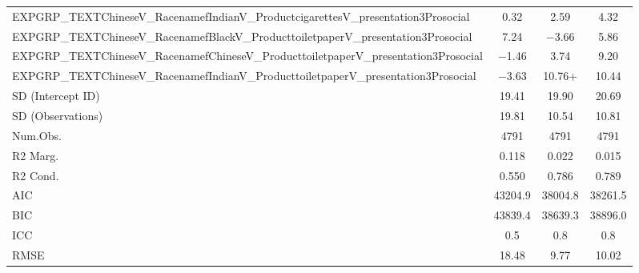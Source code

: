 \documentclass[]{report}
\begin{document}
\begin{table}
{\begin{tabular}[t]{lccc}
		EXPGRP\_TEXTChineseV\_RacenamefIndianV\_ProductcigarettesV\_presentation3Prosocial & \num{0.32} & \num{2.59} & \num{4.32}\\
		EXPGRP\_TEXTChineseV\_RacenamefBlackV\_ProducttoiletpaperV\_presentation3Prosocial & \num{7.24} & \num{-3.66} & \num{5.86}\\
		EXPGRP\_TEXTChineseV\_RacenamefChineseV\_ProducttoiletpaperV\_presentation3Prosocial & \num{-1.46} & \num{3.74} & \num{9.20}\\
		EXPGRP\_TEXTChineseV\_RacenamefIndianV\_ProducttoiletpaperV\_presentation3Prosocial & \num{-3.63} & \num{10.76}+ & \num{10.44}\\
		SD (Intercept ID) & \num{19.41} & \num{19.90} & \num{20.69}\\
		SD (Observations) & \num{19.81} & \num{10.54} & \num{10.81}\\
		\midrule
		Num.Obs. & \num{4791} & \num{4791} & \num{4791}\\
		R2 Marg. & \num{0.118} & \num{0.022} & \num{0.015}\\
		R2 Cond. & \num{0.550} & \num{0.786} & \num{0.789}\\
		AIC & \num{43204.9} & \num{38004.8} & \num{38261.5}\\
		BIC & \num{43839.4} & \num{38639.3} & \num{38896.0}\\
		ICC & \num{0.5} & \num{0.8} & \num{0.8}\\
		RMSE & \num{18.48} & \num{9.77} & \num{10.02}\\
		\bottomrule
	\end{tabular}}
\end{table}
\end{document}
